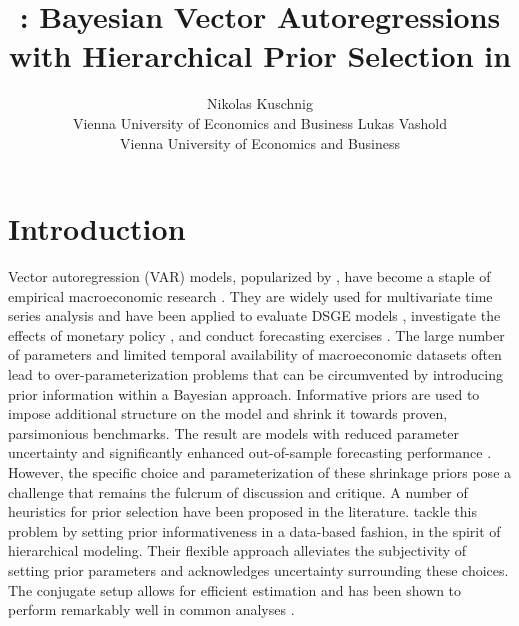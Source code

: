 \documentclass[article,nojss]{jss} %
\author{Nikolas Kuschnig \\ Vienna University of Economics and Business \And
        \And Lukas Vashold \\ Vienna University of Economics and Business}
\title{\pkg{BVAR}: Bayesian Vector Autoregressions with Hierarchical Prior Selection in \proglang{R}}
\begin{document}



\section{Introduction} \label{sec:intro}

Vector autoregression (VAR) models, popularized by \cite{sims1980}, have become a staple of empirical macroeconomic research \citep{kilian2017}. They are widely used for multivariate time series analysis and have been applied to evaluate DSGE models \citep{del2007}, investigate the effects of monetary policy \citep{bernanke2005, sims2006}, and conduct forecasting exercises \citep{litterman1986, koop2013}.
The large number of parameters and limited temporal availability of macroeconomic datasets often lead to over-parameterization problems \citep{koop2010} that can be circumvented by introducing prior information within a Bayesian approach. Informative priors are used to impose additional structure on the model and shrink it towards proven, parsimonious benchmarks. The result are models with reduced parameter uncertainty and significantly enhanced out-of-sample forecasting performance \citep{koop2013}. However, the specific choice and parameterization of these shrinkage priors pose a challenge that remains the fulcrum of discussion and critique.
A number of heuristics for prior selection have been proposed in the literature.
\cite{giannone2015} tackle this problem by setting prior informativeness in a data-based fashion, in the spirit of hierarchical modeling. Their flexible approach alleviates the subjectivity of setting prior parameters and acknowledges uncertainty surrounding these choices. The conjugate setup allows for efficient estimation and has been shown to perform remarkably well in common analyses \citep[see][]{miranda-agrippino2015, baumeister2016}.
\end{document}
